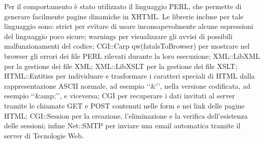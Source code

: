 {	Per il comportamento è stato utilizzato il linguaggio PERL, che permette di generare facilmente pagine dinamiche in XHTML. Le librerie incluse per tale linguaggio sono: strict per evitare di usare inconsapevolmente alcune espressioni del linguaggio poco sicure; warnings per visualizzare gli avvisi di possibili malfunzionamenti del codice; CGI::Carp qw(fatalsToBrowser) per mostrare nel browser gli errori dei file PERL rilevati durante la loro esecuzione; XML::LibXML per la gestione dei file XML; XML::LibXSLT per la gestione dei file XSLT; HTML::Entities per individuare e trasformare i caratteri speciali di HTML dalla rappresentazione ASCII normale, ad esempio ‘‘\&’’, nella versione codificata, ad esempio ‘‘\&amp;’’, e viceversa; CGI per recuperare i dati invitati al server tramite le chiamate GET e POST contenuti nelle form e nei link delle pagine HTML; CGI::Session per la creazione, l'eliminazione e la verifica dell'esistenza delle sessioni; infine Net::SMTP per inviare una email automatica tramite il server di Tecnologie Web.
}